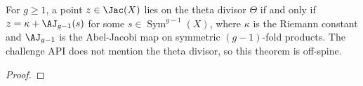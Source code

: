 \begin{theorem}
\label{thm:riemann-theorem-theta-divisor}
For \(g\ge 1\), a point \(z\in\Jac(X)\) lies on the theta divisor
\(\Theta\) if and only if \(z = \kappa + \AJ_{g-1}(s)\) for some
\(s\in\operatorname{Sym}^{g-1}(X)\), where \(\kappa\) is the Riemann
constant and \(\AJ_{g-1}\) is the Abel-Jacobi map on symmetric
\((g-1)\)-fold products.
The challenge API does not mention the theta divisor, so this theorem
is off-spine.
\leanok
\end{theorem}
\begin{proof}\leanok\end{proof}
